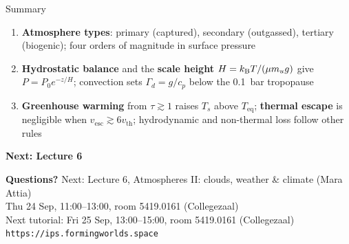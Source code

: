 \documentclass[aspectratio=169, 11pt]{beamer}
\begin{document}
\begin{frame}
\end{frame}

\begin{frame}
\end{frame}

\begin{frame}{Summary}
  \begin{enumerate}\setlength\itemsep{6pt}
    \item \textbf{Atmosphere types}: primary (captured), secondary (outgassed), tertiary (biogenic); four orders of magnitude in surface pressure
    \item \textbf{Hydrostatic balance} and the \textbf{scale height} $H = k_{\mathrm{B}} T/(\mu m_u g)$ give $P = P_0 e^{-z/H}$; convection sets $\Gamma_d = g/c_p$ below the 0.1~bar tropopause
    \item \textbf{Greenhouse warming} from $\tau \gtrsim 1$ raises $T_s$ above $T_{\mathrm{eq}}$; \textbf{thermal escape} is negligible when $v_{\mathrm{esc}} \gtrsim 6 v_{\mathrm{th}}$; hydrodynamic and non-thermal loss follow other rules
  \end{enumerate}
  \vskip8pt
  \textbf{Next: Lecture 6}
\end{frame}

\begin{frame}
  \vfill
  \begin{center}
    {\color{white}\Large\bfseries Questions?}
    \vskip20pt
    {\color{white!85}\large Next: Lecture 6, Atmospheres II: clouds, weather \& climate (Mara Attia)}\\[4pt]
    {\color{white!85}\small Thu 24 Sep, 11:00--13:00, room 5419.0161 (Collegezaal)}\\[12pt]
    {\color{white!85}\small Next tutorial: Fri 25 Sep, 13:00--15:00, room 5419.0161 (Collegezaal)}\\[20pt]
    {\color{white!70}\small \texttt{https://ips.formingworlds.space}}
  \end{center}
  \vfill
\end{frame}
\end{document}
